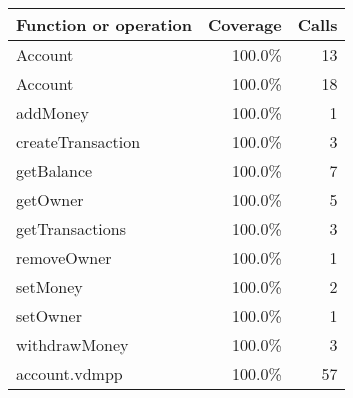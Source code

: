 \documentclass[a4paper]{article}
\begin{document}
\bigskip
\begin{longtable}{|l|r|r|}
\hline
Function or operation & Coverage & Calls \\
\hline
\hline
Account & 100.0\% & 13 \\
\hline
Account & 100.0\% & 18 \\
\hline
addMoney & 100.0\% & 1 \\
\hline
createTransaction & 100.0\% & 3 \\
\hline
getBalance & 100.0\% & 7 \\
\hline
getOwner & 100.0\% & 5 \\
\hline
getTransactions & 100.0\% & 3 \\
\hline
removeOwner & 100.0\% & 1 \\
\hline
setMoney & 100.0\% & 2 \\
\hline
setOwner & 100.0\% & 1 \\
\hline
withdrawMoney & 100.0\% & 3 \\
\hline
\hline
account.vdmpp & 100.0\% & 57 \\
\hline
\end{longtable}
\end{document}
